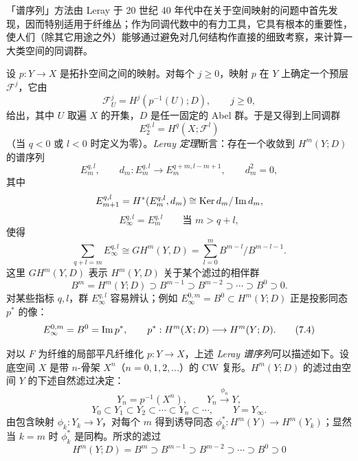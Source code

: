 「谱序列」方法由 Leray 于 20 世纪 40 年代中在关于空间映射的问题中首先发现，因而特别适用于纤维丛；作为同调代数中的有力工具，它具有根本的重要性，使人们（除其它用途之外）能够通过避免对几何结构作直接的细致考察，来计算一大类空间的同调群。

设 $p:Y\to X$ 是拓扑空间之间的映射。对每个 $j\ge0$，映射 $p$ 在 $Y$ 上确定一个预层 $\mathcal{F}^j$，它由
\begin{equation}
\mathcal{F}^j_U=H^j(p^{-1}(U);D),\qquad j\ge0, \tag{7.1}
\end{equation}
给出，其中 $U$ 取遍 $X$ 的开集，$D$ 是任一固定的 Abel 群。于是又得到上同调群
\[
E_2^{q,l}=H^q(X;\mathcal{F}^l)
\]
（当 $q<0$ 或 $l<0$ 时定义为零）。\emph{Leray 定理}断言：存在一个收敛到 $H^m(Y;D)$ 的谱序列
\begin{equation}
E_m^{q,l},\qquad d_m:E_m^{q,l}\longrightarrow E_m^{q+m,l-m+1},\qquad d_m^2=0, \tag{7.2}
\end{equation}
其中
\[
E_{m+1}^{q,l}=H^*(E_m^{q,l},d_m)\cong\operatorname{Ker} d_m/\operatorname{Im} d_m,
\]
\[
E_\infty^{q,l}=E_m^{q,l}\qquad\text{当 } m>q+l,
\]
使得
\begin{equation}
\sum_{q+l=m}E_\infty^{q,l}\cong GH^m(Y,D)=\sum_{l=0}^{m}B^{m-l}/B^{m-l-1}. \tag{7.3}
\end{equation}
这里 $GH^m(Y,D)$ 表示 $H^m(Y,D)$ 关于某个滤过的相伴群
\[
B^m=H^m(Y;D)\supset B^{m-1}\supset B^{m-2}\supset\cdots\supset B^0\supset0.
\]
对某些指标 $q,l$，群 $E_\infty^{q,l}$ 容易辨认；例如 $E_\infty^{0,m}=B^0\subset H^m(Y;D)$ 正是投影同态 $p^*$ 的像：
\begin{equation}
E_\infty^{0,m}=B^0=\operatorname{Im} p^*,\qquad p^*:H^m(X;D)\longrightarrow H^m(Y;D). \tag{7.4}
\end{equation}


对以 $F$ 为纤维的局部平凡纤维化 $p:Y\to X$，上述 \emph{Leray 谱序列}可以描述如下。设底空间 $X$ 是带 $n$-骨架 $X^n$（$n=0,1,2,\dots$）的 CW 复形。$H^m(Y;D)$ 的滤过由空间 $Y$ 的下述自然滤过决定：
\[
Y_n=p^{-1}(X^n),\qquad Y_n\xrightarrow{\phi_n}Y,
\]
\[
Y_0\subset Y_1\subset Y_2\subset\cdots\subset Y_n\subset\cdots,\qquad Y=Y_\infty.
\]
由包含映射 $\phi_k:Y_k\to Y$，对每个 $m$ 得到诱导同态 $\phi_k^*:H^m(Y)\to H^m(Y_k)$；显然当 $k=m$ 时 $\phi_k^*$ 是同构。所求的滤过
\[
H^m(Y;D)=B^m\supset B^{m-1}\supset B^{m-2}\supset\cdots\supset B^0\supset0
\]

